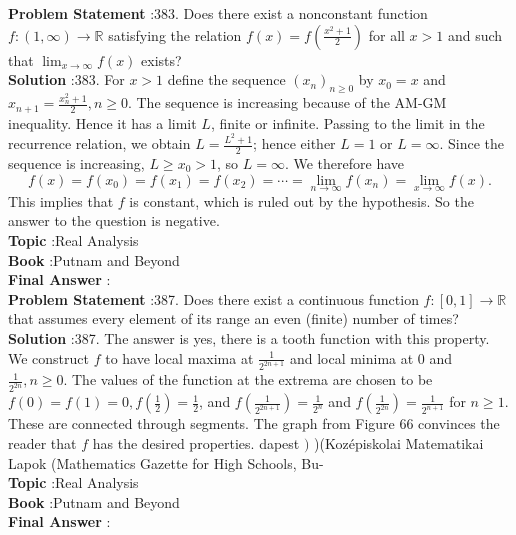 \documentclass[10pt]{article}
\begin{document}
\textbf{Problem Statement} :383. Does there exist a nonconstant function $f:(1, \infty) \rightarrow \mathbb{R}$ satisfying the relation $f(x)=f\left(\frac{x^{2}+1}{2}\right)$ for all $x>1$ and such that $\lim _{x \rightarrow \infty} f(x)$ exists?\\
\textbf{Solution} :383. For $x>1$ define the sequence $\left(x_{n}\right)_{n \geq 0}$ by $x_{0}=x$ and $x_{n+1}=\frac{x_{n}^{2}+1}{2}, n \geq 0$. The sequence is increasing because of the AM-GM inequality. Hence it has a limit $L$, finite or infinite. Passing to the limit in the recurrence relation, we obtain $L=\frac{L^{2}+1}{2}$; hence either $L=1$ or $L=\infty$. Since the sequence is increasing, $L \geq x_{0}>1$, so $L=\infty$. We therefore have$$ f(x)=f\left(x_{0}\right)=f\left(x_{1}\right)=f\left(x_{2}\right)=\cdots=\lim _{n \rightarrow \infty} f\left(x_{n}\right)=\lim _{x \rightarrow \infty} f(x) . $$This implies that $f$ is constant, which is ruled out by the hypothesis. So the answer to the question is negative.\\
\textbf{Topic} :Real Analysis\\
\textbf{Book} :Putnam and Beyond\\
\textbf{Final Answer} :\\


\textbf{Problem Statement} :387. Does there exist a continuous function $f:[0,1] \rightarrow \mathbb{R}$ that assumes every element of its range an even (finite) number of times?\\
\textbf{Solution} :387. The answer is yes, there is a tooth function with this property. We construct $f$ to have local maxima at $\frac{1}{2^{2 n+1}}$ and local minima at 0 and $\frac{1}{2^{2 n}}, n \geq 0$. The values of the function at the extrema are chosen to be $f(0)=f(1)=0, f\left(\frac{1}{2}\right)=\frac{1}{2}$, and $f\left(\frac{1}{2^{2 n+1}}\right)=\frac{1}{2^{n}}$ and $f\left(\frac{1}{2^{2 n}}\right)=\frac{1}{2^{n+1}}$ for $n \geq 1$. These are connected through segments. The graph from Figure 66 convinces the reader that $f$ has the desired properties. dapest $)$ )(Kozépiskolai Matematikai Lapok (Mathematics Gazette for High Schools, Bu-\\
\textbf{Topic} :Real Analysis\\
\textbf{Book} :Putnam and Beyond\\
\textbf{Final Answer} :\\
\end{document}
